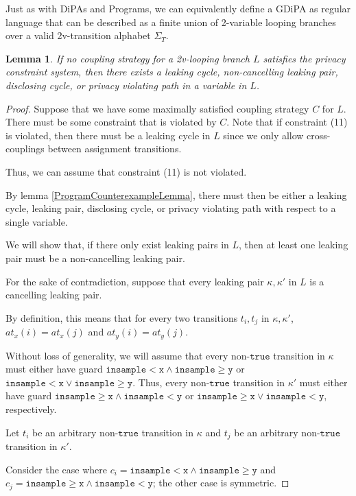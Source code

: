 \documentclass[12pt]{article}
\newcommand{\gguard}[1][x]{\texttt{insample}\geq#1}
\newcommand{\lguard}[1][x]{\texttt{insample} < #1}
\newtheorem{lemma}[thm]{Lemma}
\theoremstyle{definition}
\begin{document}
Just as with DiPAs and Programs, we can equivalently define a GDiPA as regular language that can be described as a finite union of 2-variable looping branches over a valid 2v-transition alphabet $\Sigma_T$. 


\begin{lemma}
    If no coupling strategy for a 2v-looping branch $L$ satisfies the privacy constraint system, then there exists a leaking cycle, non-cancelling leaking pair, disclosing cycle, or privacy violating path in a variable in $L$.
\end{lemma}
\begin{proof}
    Suppose that we have some maximally satisfied coupling strategy $C$ for $L$. There must be some constraint that is violated by $C$. Note that if constraint (11) is violated, then there must be a leaking cycle in $L$ since we only allow cross-couplings between assignment transitions. 

    Thus, we can assume that constraint (11) is not violated. 

    By lemma \ref{ProgramCounterexampleLemma}, there must then be either a leaking cycle, leaking pair, disclosing cycle, or privacy violating path with respect to a single variable. 

    We will show that, if there only exist leaking pairs in $L$, then at least one leaking pair must be a non-cancelling leaking pair. 

    For the sake of contradiction, suppose that every leaking pair $\kappa, \kappa'$ in $L$ is a cancelling leaking pair. 

    By definition, this means that for every two transitions $t_i, t_j$ in $\kappa, \kappa'$, $at_x(i) = at_x(j)$ and $at_y(i) = at_y(j)$.

    Without loss of generality, we will assume that every non-$\texttt{true}$ transition in $\kappa$ must either have guard $\lguard[\texttt{x}]\land\gguard[\texttt{y}]$ or $\lguard[\texttt{x}]\lor\gguard[\texttt{y}]$. Thus, every non-$\texttt{true}$ transition in $\kappa'$ must either have guard $\gguard[\texttt{x}]\land\lguard[\texttt{y}]$ or $\gguard[\texttt{x}]\lor\lguard[\texttt{y}]$, respectively. 

    Let $t_i$ be an arbitrary non-$\texttt{true}$ transition in $\kappa$ and $t_j$ be an arbitrary non-$\texttt{true}$ transition in $\kappa'$.

    Consider the case where $c_i = \lguard[\texttt{x}]\land\gguard[\texttt{y}]$ and $c_j = \gguard[\texttt{x}]\land\lguard[\texttt{y}]$; the other case is symmetric.


\end{proof}
\end{document}
